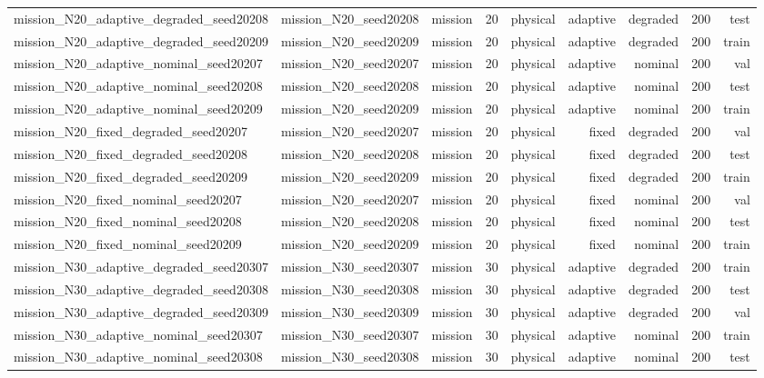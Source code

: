 \begin{tabular}{lrrrrrrrr}
mission\_N20\_adaptive\_degraded\_seed20208 & mission\_N20\_seed20208 & mission & 20 & physical & adaptive & degraded & 200 & test \\
mission\_N20\_adaptive\_degraded\_seed20209 & mission\_N20\_seed20209 & mission & 20 & physical & adaptive & degraded & 200 & train \\
mission\_N20\_adaptive\_nominal\_seed20207 & mission\_N20\_seed20207 & mission & 20 & physical & adaptive & nominal & 200 & val \\
mission\_N20\_adaptive\_nominal\_seed20208 & mission\_N20\_seed20208 & mission & 20 & physical & adaptive & nominal & 200 & test \\
mission\_N20\_adaptive\_nominal\_seed20209 & mission\_N20\_seed20209 & mission & 20 & physical & adaptive & nominal & 200 & train \\
mission\_N20\_fixed\_degraded\_seed20207 & mission\_N20\_seed20207 & mission & 20 & physical & fixed & degraded & 200 & val \\
mission\_N20\_fixed\_degraded\_seed20208 & mission\_N20\_seed20208 & mission & 20 & physical & fixed & degraded & 200 & test \\
mission\_N20\_fixed\_degraded\_seed20209 & mission\_N20\_seed20209 & mission & 20 & physical & fixed & degraded & 200 & train \\
mission\_N20\_fixed\_nominal\_seed20207 & mission\_N20\_seed20207 & mission & 20 & physical & fixed & nominal & 200 & val \\
mission\_N20\_fixed\_nominal\_seed20208 & mission\_N20\_seed20208 & mission & 20 & physical & fixed & nominal & 200 & test \\
mission\_N20\_fixed\_nominal\_seed20209 & mission\_N20\_seed20209 & mission & 20 & physical & fixed & nominal & 200 & train \\
mission\_N30\_adaptive\_degraded\_seed20307 & mission\_N30\_seed20307 & mission & 30 & physical & adaptive & degraded & 200 & train \\
mission\_N30\_adaptive\_degraded\_seed20308 & mission\_N30\_seed20308 & mission & 30 & physical & adaptive & degraded & 200 & test \\
mission\_N30\_adaptive\_degraded\_seed20309 & mission\_N30\_seed20309 & mission & 30 & physical & adaptive & degraded & 200 & val \\
mission\_N30\_adaptive\_nominal\_seed20307 & mission\_N30\_seed20307 & mission & 30 & physical & adaptive & nominal & 200 & train \\
mission\_N30\_adaptive\_nominal\_seed20308 & mission\_N30\_seed20308 & mission & 30 & physical & adaptive & nominal & 200 & test \\

\end{tabular}
